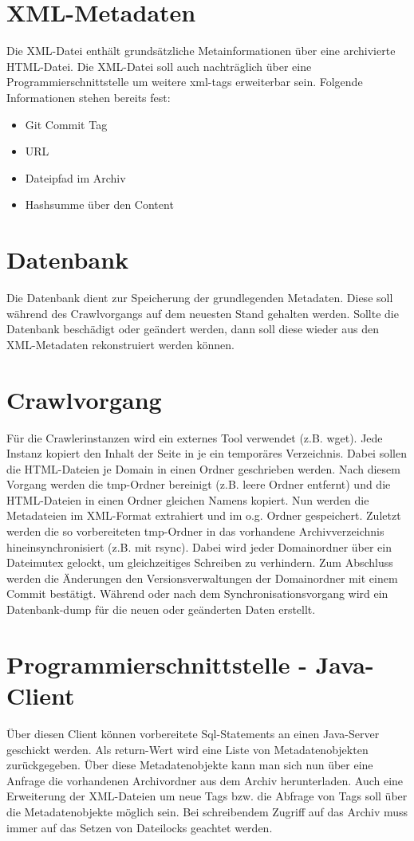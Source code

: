 \chapter{XML-Metadaten}
Die XML-Datei enthält grundsätzliche Metainformationen über eine archivierte HTML-Datei.
Die XML-Datei soll auch nachträglich über eine Programmierschnittstelle um weitere xml-tags erweiterbar sein.
Folgende Informationen stehen bereits fest: 
\begin{itemize}
	\item Git Commit Tag
	\item URL
	\item Dateipfad im Archiv
	\item Hashsumme über den Content
\end{itemize}

\chapter{Datenbank}
Die Datenbank dient zur Speicherung der grundlegenden Metadaten.
Diese soll während des Crawlvorgangs auf dem neuesten Stand gehalten werden.
Sollte die Datenbank beschädigt oder geändert werden, dann soll diese wieder aus den
XML-Metadaten rekonstruiert werden können.
 
\chapter{Crawlvorgang}
Für die Crawlerinstanzen wird ein externes Tool verwendet (z.B. wget).
Jede Instanz kopiert den Inhalt der Seite in je ein temporäres Verzeichnis.
Dabei sollen die HTML-Dateien je Domain in einen Ordner geschrieben werden.
Nach diesem Vorgang werden die tmp-Ordner bereinigt (z.B. leere Ordner entfernt)
und die HTML-Dateien in einen Ordner gleichen Namens kopiert.
Nun werden die Metadateien im XML-Format extrahiert und im o.g. Ordner gespeichert.
Zuletzt werden die so vorbereiteten tmp-Ordner in das vorhandene Archivverzeichnis
hineinsynchronisiert (z.B. mit rsync). Dabei wird jeder Domainordner über ein Dateimutex gelockt, um
gleichzeitiges Schreiben zu verhindern.
Zum Abschluss werden die Änderungen den Versionsverwaltungen der Domainordner mit einem Commit bestätigt.
Während oder nach dem Synchronisationsvorgang wird ein Datenbank-dump für die neuen oder geänderten Daten
erstellt. 

\chapter{Programmierschnittstelle - Java-Client}
Über diesen Client können vorbereitete Sql-Statements an einen Java-Server geschickt werden. Als return-Wert
wird eine Liste von Metadatenobjekten zurückgegeben.
Über diese Metadatenobjekte kann man sich nun über eine Anfrage die vorhandenen Archivordner aus dem Archiv herunterladen.
Auch eine Erweiterung der XML-Dateien um neue Tags bzw. die Abfrage von Tags soll über die 
Metadatenobjekte möglich sein.
Bei schreibendem Zugriff auf das Archiv muss immer auf das Setzen von Dateilocks geachtet werden.


 
